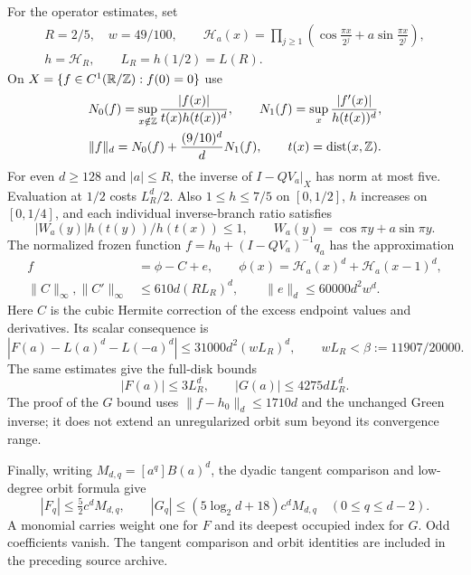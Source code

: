 \documentclass[11pt,a4paper]{article}
\theoremstyle{remark}\newtheorem*{ednote}{Editorial note (ProveIt, 2026-10-01)}
\newcommand{\HH}{\mathcal H}\newcommand{\GG}{\mathcal G}
\begin{document}
For the operator estimates, set
\begin{gather*}
 R=2/5,\quad w=49/100,\qquad
 \HH_a(x)=\prod_{j\ge1}\left(\cos\frac{\pi x}{2^j}+a\sin\frac{\pi x}{2^j}\right),\\
 h=\HH_R,\qquad L_R=h(1/2)=L(R).
\end{gather*}
On $X=\{f\in C^1(\mathbb R/\mathbb Z):f(0)=0\}$ use
\begin{gather*}
 N_0(f)=\sup_{x\notin\mathbb Z}\frac{|f(x)|}{t(x)h(t(x))^d},\qquad
 N_1(f)=\sup_x\frac{|f'(x)|}{h(t(x))^d},\\
 \|f\|_d=N_0(f)+\frac{(9/10)^d}{d}N_1(f),\qquad
 t(x)=\operatorname{dist}(x,\mathbb Z).
\end{gather*}
For even $d\ge128$ and $|a|\le R$, the inverse of $I-QV_a|_X$ has norm at most five. Evaluation at $1/2$ costs $L_R^d/2$. Also $1\le h\le7/5$ on $[0,1/2]$, $h$ increases on $[0,1/4]$, and each individual inverse-branch ratio satisfies
\begin{equation}\label{eq:branch}
 |W_a(y)|h(t(y))/h(t(x))\le1,
 \qquad W_a(y)=\cos\pi y+a\sin\pi y.
\end{equation}
The normalized frozen function $f=h_0+(I-QV_a)^{-1}q_a$ has the approximation
\begin{equation}\label{eq:repair}
 \begin{aligned}
 f&=\phi-C+e,\qquad \phi(x)=\HH_a(x)^d+\HH_a(x-1)^d,\\
 \|C\|_\infty,\|C'\|_\infty&\le610d(RL_R)^d,\qquad
 \|e\|_d\le60000d^2w^d.
 \end{aligned}
\end{equation}
Here $C$ is the cubic Hermite correction of the excess endpoint values and derivatives. Its scalar consequence is
\begin{equation}\label{eq:scalarerror}
 |F(a)-L(a)^d-L(-a)^d|\le31000d^2(wL_R)^d,
 \qquad wL_R<\beta:=11907/20000.
\end{equation}
The same estimates give the full-disk bounds
\begin{equation}\label{eq:fullFG}
 |F(a)|\le3L_R^d,\qquad |G(a)|\le4275dL_R^d.
\end{equation}
The proof of the $G$ bound uses $\|f-h_0\|_d\le1710d$ and the unchanged Green inverse; it does not extend an unregularized orbit sum beyond its convergence range.

Finally, writing $M_{d,q}=[a^q]B(a)^d$, the dyadic tangent comparison and low-degree orbit formula give
\begin{equation}\label{eq:lowbounds}
 |F_q|\le\tfrac52c^dM_{d,q},\qquad
 |G_q|\le(5\log_2d+18)c^dM_{d,q}\quad(0\le q\le d-2).
\end{equation}
A monomial carries weight one for $F$ and its deepest occupied index for $G$. Odd coefficients vanish. The tangent comparison and orbit identities are included in the preceding source archive.
\end{document}
